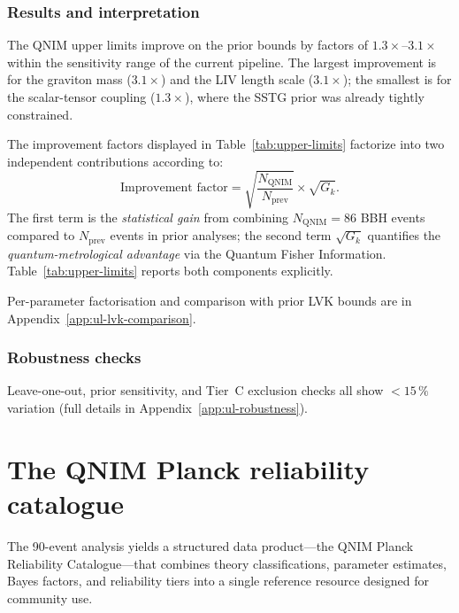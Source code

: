 \documentclass[11pt,a4paper, english]{book}
\theoremstyle{plain}
\theoremstyle{definition}
\numberwithin{equation}{chapter}
\numberwithin{figure}{chapter}
\numberwithin{table}{chapter}
\begin{document}
\subsubsection{Results and interpretation}
\label{subsubsec:ul-results}

The QNIM upper limits improve on the prior bounds by factors of
$1.3\times$--$3.1\times$ within the sensitivity range of the
current pipeline. The largest improvement is for the graviton mass
($3.1\times$) and the LIV length scale ($3.1\times$); the smallest
is for the scalar-tensor coupling ($1.3\times$), where the SSTG
prior was already tightly constrained.

The improvement factors displayed in Table~\ref{tab:upper-limits} factorize into
two independent contributions according to:
\begin{equation}
  \text{Improvement factor} = \sqrt{\frac{N_\mathrm{QNIM}}{N_\mathrm{prev}}} \times \sqrt{G_k}.
\end{equation}
The first term is the \emph{statistical gain} from combining $N_\mathrm{QNIM} = 86$
BBH events compared to $N_\mathrm{prev}$ events in prior analyses; the second term
$\sqrt{G_k}$ quantifies the \emph{quantum-metrological advantage} via the Quantum Fisher
Information. Table~\ref{tab:upper-limits} reports both components explicitly.

Per-parameter factorisation and comparison with prior LVK bounds are in Appendix~\ref{app:ul-lvk-comparison}.

\subsubsection{Robustness checks}
\label{subsubsec:ul-robustness}

Leave-one-out, prior sensitivity, and Tier~C exclusion checks all show $< 15\,\%$ variation (full details in Appendix~\ref{app:ul-robustness}).


\section{The QNIM Planck reliability catalogue}
\label{sec:planck-catalogue}

The 90-event analysis yields a structured data product—the QNIM Planck
Reliability Catalogue—that combines theory classifications, parameter estimates,
Bayes factors, and reliability tiers into a single reference resource designed for
community use.
\end{document}
